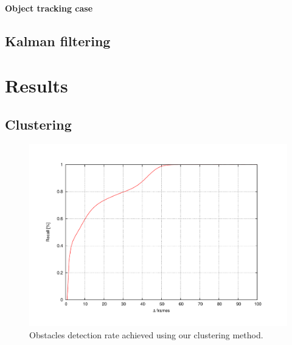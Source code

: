 \paragraph{Object tracking case}\label{ch:chapter04_01_04_02_02}

\subsection{Kalman filtering}\label{ch:chapter04_01_05}

\section{Results}\label{ch:chapter04_02}

\subsection{Clustering}\label{ch:chapter04_02_01}

\begin{figure}[h!]
\centering
\includegraphics[trim=50 40 80 60,clip]{detectionRate}
\caption{Obstacles detection rate achieved using our clustering method.}\label{fig:cp04_detection_rate}
\end{figure}

